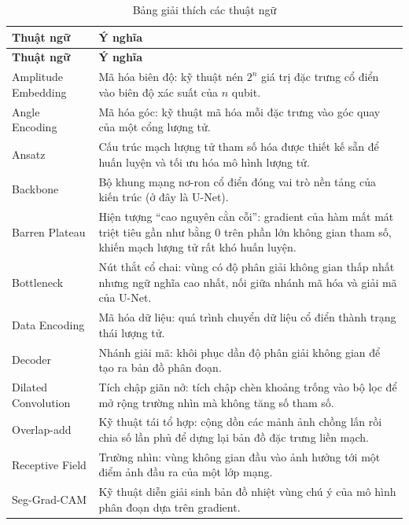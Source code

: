 \begin{center}
\begin{longtable}{|p{3.6cm}|p{11.4cm}|}
\caption{Bảng giải thích các thuật ngữ} \label{tab:terms} \\
\hline
\textbf{Thuật ngữ} & \textbf{Ý nghĩa} \\
\hline
\endfirsthead

\hline
\textbf{Thuật ngữ} & \textbf{Ý nghĩa} \\
\hline
\endhead

\hline
\endfoot

\hline
\endlastfoot

Amplitude Embedding & Mã hóa biên độ: kỹ thuật nén $2^n$ giá trị đặc trưng cổ điển vào biên độ xác suất của $n$ qubit. \\ \hline
Angle Encoding & Mã hóa góc: kỹ thuật mã hóa mỗi đặc trưng vào góc quay của một cổng lượng tử. \\ \hline
Ansatz & Cấu trúc mạch lượng tử tham số hóa được thiết kế sẵn để huấn luyện và tối ưu hóa mô hình lượng tử. \\ \hline
Backbone & Bộ khung mạng nơ-ron cổ điển đóng vai trò nền tảng của kiến trúc (ở đây là U-Net). \\ \hline
Barren Plateau & Hiện tượng ``cao nguyên cằn cỗi'': gradient của hàm mất mát triệt tiêu gần như bằng 0 trên phần lớn không gian tham số, khiến mạch lượng tử rất khó huấn luyện. \\ \hline
Bottleneck & Nút thắt cổ chai: vùng có độ phân giải không gian thấp nhất nhưng ngữ nghĩa cao nhất, nối giữa nhánh mã hóa và giải mã của U-Net. \\ \hline
Data Encoding & Mã hóa dữ liệu: quá trình chuyển dữ liệu cổ điển thành trạng thái lượng tử. \\ \hline
Decoder & Nhánh giải mã: khôi phục dần độ phân giải không gian để tạo ra bản đồ phân đoạn. \\ \hline
Dilated Convolution & Tích chập giãn nở: tích chập chèn khoảng trống vào bộ lọc để mở rộng trường nhìn mà không tăng số tham số. \\ \hline
Overlap-add & Kỹ thuật tái tổ hợp: cộng dồn các mảnh ảnh chồng lấn rồi chia số lần phủ để dựng lại bản đồ đặc trưng liền mạch. \\ \hline
Receptive Field & Trường nhìn: vùng không gian đầu vào ảnh hưởng tới một điểm ảnh đầu ra của một lớp mạng. \\ \hline
Seg-Grad-CAM & Kỹ thuật diễn giải sinh bản đồ nhiệt vùng chú ý của mô hình phân đoạn dựa trên gradient. \\ \hline

\end{longtable}
\end{center}
